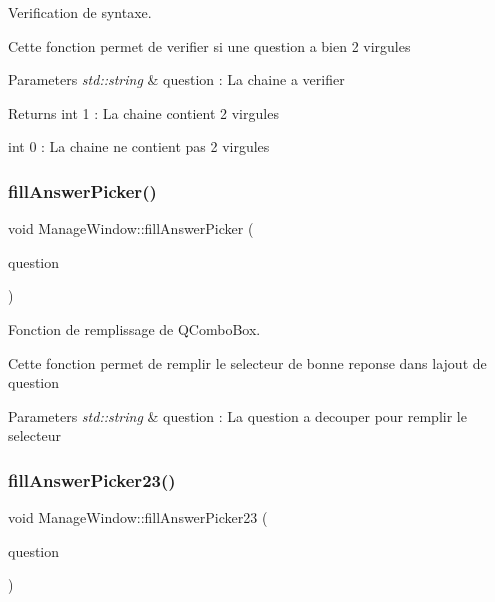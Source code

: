 Verification de syntaxe. 

Cette fonction permet de verifier si une question a bien 2 virgules 
\begin{DoxyParams}{Parameters}
{\em std\+::string} & question \+: La chaine a verifier \\
\hline
\end{DoxyParams}
\begin{DoxyReturn}{Returns}
int 1 \+: La chaine contient 2 virgules 

int 0 \+: La chaine ne contient pas 2 virgules 
\end{DoxyReturn}
\mbox{\label{classManageWindow_a1276d421282259be54035b2137a71ccf}} 
\subsubsection{\texorpdfstring{fill\+Answer\+Picker()}{fillAnswerPicker()}}
{\footnotesize\ttfamily void Manage\+Window\+::fill\+Answer\+Picker (\begin{DoxyParamCaption}\item[{string}]{question }\end{DoxyParamCaption})}



Fonction de remplissage de Q\+Combo\+Box. 

Cette fonction permet de remplir le selecteur de bonne reponse dans l\textquotesingle{}ajout de question 
\begin{DoxyParams}{Parameters}
{\em std\+::string} & question \+: La question a decouper pour remplir le selecteur \\
\hline
\end{DoxyParams}
\mbox{\label{classManageWindow_a40b1c990354a0df80a73889eb78dc02b}} 
\subsubsection{\texorpdfstring{fill\+Answer\+Picker23()}{fillAnswerPicker23()}}
{\footnotesize\ttfamily void Manage\+Window\+::fill\+Answer\+Picker23 (\begin{DoxyParamCaption}\item[{string}]{question }\end{DoxyParamCaption})}



